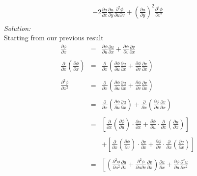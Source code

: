 \documentclass[10pt]{amsart}
\theoremstyle{nonumberplain}
\begin{document}
\begin{enumerate}[label={\bf {\arabic*}:}]
\begin{eqnarray*}
							- 2 \frac{\partial u}{\partial x} \frac{\partial u}{\partial y} \frac{\partial^2 \phi}{\partial u \partial v}
							+ \left(\frac{\partial u}{\partial y}\right)^2 \frac{\partial^2 \phi}{\partial v^2} \\
\end{eqnarray*}
\textit{Solution:} \\
Starting from our previous result
\begin{eqnarray*}
\frac{\partial\phi}{\partial x} &=& \frac{\partial\phi}{\partial u} \frac{\partial u}{\partial x} + \frac{\partial\phi}{\partial v} \frac{\partial v}{\partial x} \\ \\
\frac{\partial}{\partial x} \left(\frac{\partial\phi}{\partial x}\right) &=& \frac{\partial}{\partial x} \left(\frac{\partial\phi}{\partial u} \frac{\partial u}{\partial x} + \frac{\partial\phi}{\partial v} \frac{\partial v}{\partial x}\right) \\ \\
\frac{\partial^2\phi}{\partial x^2} &=& \frac{\partial}{\partial x} \left(\frac{\partial\phi}{\partial u} \frac{\partial u}{\partial x} + \frac{\partial\phi}{\partial v} \frac{\partial v}{\partial x}\right) \\ \\
						&=& \frac{\partial}{\partial x} \left(\frac{\partial\phi}{\partial u} \frac{\partial u}{\partial x}\right)
							+ \frac{\partial}{\partial x}  \left(\frac{\partial\phi}{\partial v} \frac{\partial v}{\partial x}\right) \\ \\
						&=& \left[ 
							\frac{\partial}{\partial x} \left( \frac{\partial\phi}{\partial u} \right) \cdot \frac{\partial u}{\partial x}
							+ \frac{\partial\phi}{\partial u} \cdot \frac{\partial}{\partial x} \left(\frac{\partial u}{\partial x} \right)
						\right] \\ \\
						&& + \left[ 
							\frac{\partial}{\partial x} \left( \frac{\partial\phi}{\partial v} \right) \cdot \frac{\partial v}{\partial x}
							+ \frac{\partial\phi}{\partial v} \cdot \frac{\partial}{\partial x} \left(\frac{\partial v}{\partial x} \right)
						\right] \\ \\
						&=& \left[ 
							\left( \frac{\partial^2 \phi}{\partial u^2} \frac{\partial u}{\partial x} + \frac{\partial^2 \phi}{\partial u \partial v} \frac{\partial v}{\partial x} \right) \frac{\partial u}{\partial x}
							+ \frac{\partial\phi}{\partial u} \frac{\partial^2 u}{\partial x^2}

\end{eqnarray*}
\end{enumerate}
\end{document}
